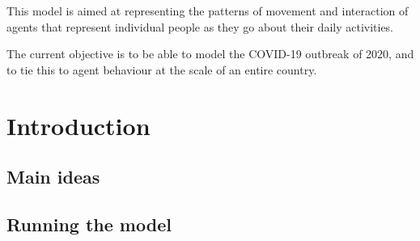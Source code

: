 This model is aimed at representing the patterns of movement and interaction of agents that represent individual people as they go about their daily activities.

The current objective is to be able to model the C\+O\+V\+I\+D-\/19 outbreak of 2020, and to tie this to agent behaviour at the scale of an entire country.\hypertarget{index_intro_sec}{}\section{Introduction}\label{index_intro_sec}
\hypertarget{index_Main}{}\subsection{Main ideas}\label{index_Main}
\hypertarget{index_Run}{}\subsection{Running the model}\label{index_Run}
